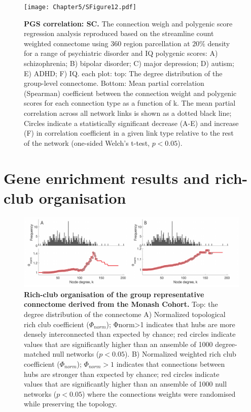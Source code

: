 \begin{figure}[h!]
\begin{center}
\texttt{[image: Chapter5/SFigure12.pdf]}%
\end{center}
\caption{\textbf{PGS correlation: SC.} 
The connection weigh and polygenic score regression analysis reproduced based on the streamline count weighted connectome using 360 region parcellation at $20\%$ density for a range of psychiatric disorder and IQ polygenic scores: A) schizophrenia; B) bipolar disorder; C) major depression; D) autism; E) ADHD; F) IQ. each plot: top: The degree distribution of the group-level connectome. Bottom: Mean partial correlation (Spearman) coefficient between the connection weight and polygenic scores for each connection type as a function of k. The mean partial correlation across all network links is shown as a dotted black line; Circles indicate a statistically significant decrease (A-E) and increase (F) in correlation coefficient in a given link type relative to the rest of the network (one-sided Welch's t-test, $p < 0.05$). }
\label{fig:Ch5SFig12}
\end{figure}

\newpage
\section{Gene enrichment results and rich-club organisation}
\label{app:AppendixCh5_3}

\begin{figure}[h!]
\begin{center}
\includegraphics[width=1\textwidth]{Chapter5/SFigure13.pdf}%
\end{center}
\caption{\textbf{Rich-club organisation of the group representative connectome derived from the Monash Cohort.} 
Top: the degree distribution of the connectome A) Normalized topological rich club coefficient ($\Phi_{norm}$); Φnorm>1 indicates that hubs are more densely interconnected than expected by chance; red circles indicate values that are significantly higher than an ansemble of 1000 degree-matched null networks ($p<0.05$). B) Normalized weighted rich club coefficient ($\Phi_{norm}$); $\Phi_{norm}>1$ indicates that connections between hubs are stronger than expected by chance; red circles indicate values that are significantly higher than an ansemble of 1000 null networks ($p<0.05$) where the connections weights were randomised while preserving the topology. }
\label{fig:Ch5SFig13}
\end{figure}

